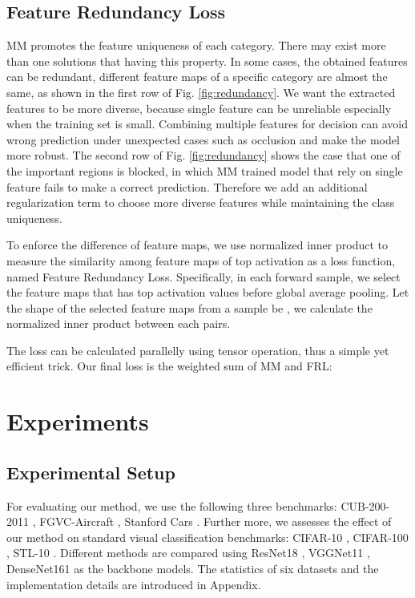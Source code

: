 \documentclass{article}
\theoremstyle{definition}
\begin{document}
\subsection{Feature Redundancy Loss}
MM promotes the feature uniqueness of each category. There may exist more than one solutions that having this property. In some cases, the obtained features can be redundant, different feature maps of a specific category are almost the same, as shown in the first row of Fig. \ref{fig:redundancy}. We want the extracted features to be more diverse, because single feature can be unreliable especially when the training set is small. Combining multiple features for decision can avoid wrong prediction under unexpected cases such as occlusion and make the model more robust. The second row of Fig. \ref{fig:redundancy} shows the case that one of the important regions is blocked, in which MM trained model that rely on single feature fails to make a correct prediction. Therefore we add an additional regularization term to choose more diverse features while maintaining the class uniqueness.

To enforce the difference of feature maps, we use normalized inner product to measure the similarity among feature maps of top activation as a loss function, named Feature Redundancy Loss. Specifically, in each forward sample, we select the feature maps that has top  activation values before global average pooling. Let the shape of the selected feature maps  from a sample  be , we calculate the normalized inner product between each pairs.

The loss can be calculated parallelly using tensor operation, thus a simple yet efficient trick. Our final loss is the weighted sum of MM and FRL:


\section{Experiments}
\subsection{Experimental Setup}
For evaluating our method, we use the following three benchmarks: CUB-200-2011 \cite{wah2011caltech}, FGVC-Aircraft \cite{maji2013fine}, Stanford Cars \cite{KrauseStarkDengFei-Fei_3DRR2013}. Further more, we assesses the effect of our method on standard visual classification benchmarks: CIFAR-10 \cite{krizhevsky2009learning}, CIFAR-100 \cite{krizhevsky2009learning}, STL-10 \cite{coates2011analysis}. Different methods are compared using ResNet18 \cite{he2016deep}, VGGNet11 \cite{simonyan2014very}, DenseNet161 \cite{huang2017densely} as the backbone models. The statistics of six datasets and the implementation details are introduced in Appendix.
\end{document}
